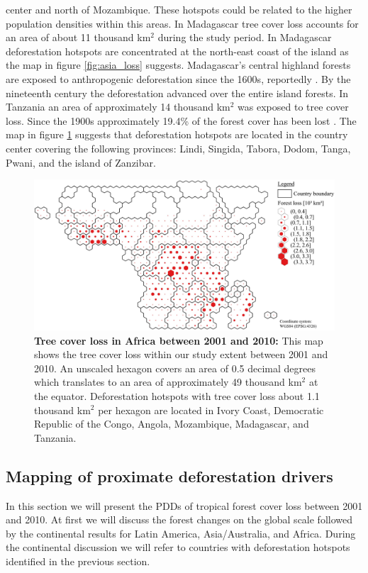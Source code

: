 center and north of Mozambique. These hotspots could be related to the higher population densities within this areas. In Madagascar tree cover loss accounts for an area of about 11 thousand km$^2$ during the study period. In Madagascar deforestation hotspots are concentrated at the north-east coast of the island as the map in figure \ref{fig:asia_loss} suggests. Madagascar's central highland forests are exposed to anthropogenic deforestation since the 1600s, reportedly \citep{Harper2007}. By the nineteenth century the deforestation advanced over the entire island forests. In Tanzania an area of approximately 14 thousand km$^2$ was exposed to tree cover loss. Since the 1900s approximately 19.4\% of the forest cover has been lost \citep{Kideghesho2015}. The map in figure \ref{fig:africa_loss} suggests that deforestation hotspots are located in the country center covering the following provinces: Lindi, Singida, Tabora, Dodom, Tanga, Pwani, and the island of Zanzibar.
			\begin{figure}[ht]
				\centering
				\includegraphics[scale=.85]{img/africa_loss_frameless}
				\caption[Tree cover loss in Africa between 2001 and 2010]{\textbf{Tree cover loss in Africa between 2001 and 2010:} This map shows the tree cover loss within our study extent between 2001 and 2010. An unscaled hexagon covers an area of 0.5 decimal degrees which translates to an area of approximately 49 thousand km$^2$ at the equator. Deforestation hotspots with tree cover loss about 1.1 thousand km$^2$ per hexagon are located in Ivory Coast, Democratic Republic of the Congo, Angola, Mozambique, Madagascar, and Tanzania.}
				\label{fig:africa_loss}
			\end{figure}

		\subsection{Mapping of proximate deforestation drivers}
		\label{subsec:results_proxy_deforestation_drivers}
			In this section we will present the \acp{PDD} of tropical forest cover loss between 2001 and 2010. At first we will discuss the forest changes on the global scale followed by the continental results for Latin America, Asia/Australia, and Africa. During the continental discussion we will refer to countries with deforestation hotspots identified in the previous section. 

